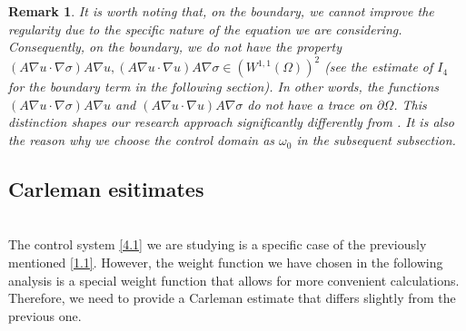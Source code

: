 \documentclass[9pt,reqno]{amsart}
\theoremstyle{plain}
\newtheorem{remark}[theorem]{Remark}
\numberwithin{equation}{section}
\numberwithin{theorem}{section}
\begin{document}
	\begin{remark}
		It is worth noting that, on the boundary, we cannot improve the regularity due to the specific nature of the equation we are considering. Consequently, on the boundary, we do not have the property $(A \nabla u \cdot \nabla \sigma) A \nabla u, (A\nabla u\cdot\nabla u)A\nabla\sigma\in (W^{1,1}(\Omega))^2$ (see the estimate of $I_4$ for the boundary term in the following section). In other words, the functions $(A \nabla u \cdot \nabla \sigma) A \nabla u$ and $(A\nabla u\cdot\nabla u)A\nabla\sigma$ do not have a trace on $\partial\Omega$. This distinction shapes our research approach significantly differently from \cite{CA5,CA6}. It is also the reason why we choose the control domain as $\omega_0$ in the subsequent subsection.
	\end{remark}
	
	
	\subsection{Carleman esitimates}
	
	\hspace*{\fill}\\
	
	The control system \eqref{4.1} we are studying is a specific case of the previously mentioned \eqref{1.1}. However, the weight function we have chosen in the following analysis is a special weight function that allows for more convenient calculations. Therefore, we need to provide a Carleman estimate that differs slightly from the previous one.
	
\end{document}

